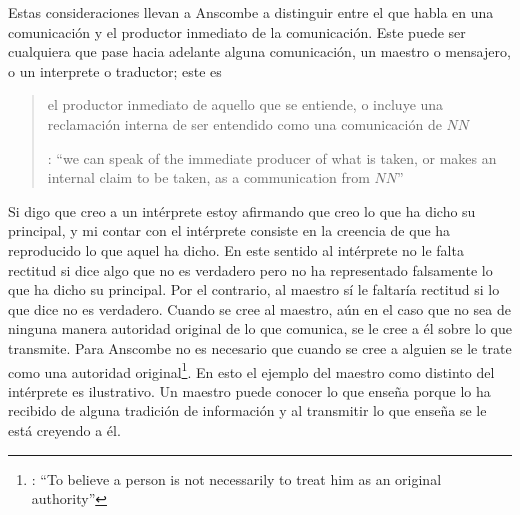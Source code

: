 Estas consideraciones llevan a Anscombe a distinguir entre el que habla en una comunicación y el productor inmediato de la comunicación. Este puede ser cualquiera que pase hacia adelante alguna comunicación, un maestro o mensajero, o un interprete o traductor; este es \blockquote[{\cite[8]{anscombe2008faith:tobelieve}}: \enquote{we can speak of the immediate producer of what is taken, or makes an internal claim to be taken, as a communication from $NN$}]{el productor inmediato de aquello que se entiende, o incluye una reclamación interna de ser entendido como una comunicación de $NN$}. Si digo que creo a un intérprete estoy afirmando que creo lo que ha dicho su principal, y mi contar con el intérprete consiste en la creencia de que ha reproducido lo que aquel ha dicho. En este sentido al intérprete no le falta rectitud si dice algo que no es verdadero pero no ha representado falsamente lo que ha dicho su principal. Por el contrario, al maestro sí le faltaría rectitud si lo que dice no es verdadero. Cuando se cree al maestro, aún en el caso que no sea de ninguna manera autoridad original de lo que comunica, se le cree a él sobre lo que transmite. Para Anscombe no es necesario que cuando se cree a alguien se le trate como una autoridad original\footnote{\cite[Cf.~][5]{anscombe2008faith:tobelieve}: \enquote{To believe a person is not necessarily to treat him as an original authority}}. En esto el ejemplo del maestro como distinto del intérprete es ilustrativo. Un maestro puede conocer lo que enseña porque lo ha recibido de alguna tradición de información y al transmitir lo que enseña se le está creyendo a él.

